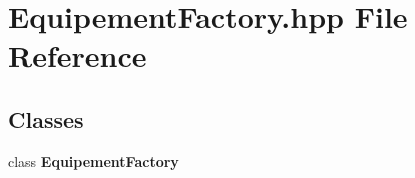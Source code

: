 \section{Equipement\-Factory.\-hpp File Reference}
\label{_equipement_factory_8hpp}
\subsection*{Classes}
\begin{DoxyCompactItemize}
\item 
class {\bf Equipement\-Factory}
\end{DoxyCompactItemize}
